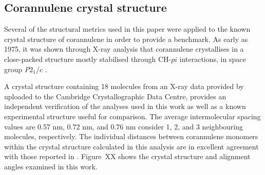 

\subsection{Corannulene crystal structure}
\label{secSI:corannulenecrystal}
Several of the structural metrics used in this paper were applied to the known crystal structure of corannulene in order to provide a benchmark. 
As early as 1975, it was shown through X-ray analysis that corannulene crystallises in a close-packed structure mostly stabilised through CH-$pi$ interactions, in space group \textit{P}$2_{1}/c$ \cite{hanson1976crystal}.

A crystal structure containing 18 molecules from an X-ray data provided by \citet{Petrukhina2005} uploaded to the Cambridge Crystallographic Data Centre, provides an independent verification of the analyses used in this work as well as a known experimental structure useful for comparison. The average intermolecular spacing values are 0.57 nm, 0.72 nm, and 0.76 nm consider 1, 2, and 3 neighbouring molecules, respectively. The individual distances between corannulene monomers within the crystal structure calculated in this analysis are in excellent agreement with those reported in \citet{sanyal2014functional}. Figure~XX shows the crystal structure and alignment angles examined in this work.

